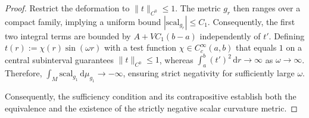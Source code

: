 \documentclass[12pt,a4paper]{amsart}
\theoremstyle{plain}
\theoremstyle{definition}
\theoremstyle{remark}
\newcommand{\ga}{\mathit{g}} %
\begin{document}
\begin{proof}
Restrict the deformation to $\|t\|_{C^0}\le 1$. The metric $g_r$ then ranges over a compact family, implying a uniform bound $|\mathrm{scal}_{g_r}|\le C_1$. Consequently, the first two integral terms are bounded by $A+VC_1(b-a)$ independently of $t'$. Defining $t(r) := \chi(r)\sin(\omega r)$ with a test function $\chi\in C^\infty_c(a,b)$ that equals $1$ on a central subinterval guarantees $\|t\|_{C^0}\le 1$, whereas $\int_a^b(t')^2\,\mathrm{d}r\to\infty$ as $\omega\to\infty$. Therefore, $\int_M\mathrm{scal}_{\ga_1}\,\mathrm{d}\mu_{\ga_1}\to-\infty$, ensuring strict negativity for sufficiently large $\omega$.

Consequently, the sufficiency condition and its contrapositive establish both the equivalence and the existence of the strictly negative scalar curvature metric.
\end{proof}

\ 
\end{document}
